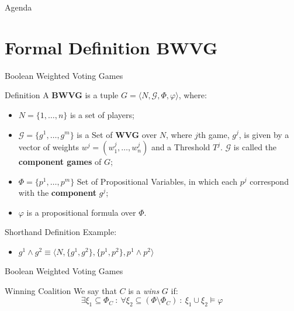 \documentclass{beamer}
\begin{document}
\begin{frame}[fragile]{Agenda}
  \section{Formal Definition BWVG}
  \tableofcontents[currentsection]
\end{frame}

\begin{frame}[fragile]{Boolean Weighted Voting Games}
  \begin{block}{Definition}
    A \textbf{BWVG} is a tuple $G = \langle N, \mathcal{G}, \Phi, \varphi \rangle$, where:
    \begin{itemize}
      \item $N = \{1,\dots,n\}$ is a set of players;
      \item $\mathcal{G} = \{g^1, \dots, g^m\}$ is a Set of \textbf{WVG} over $N$, where $j$th game, $g^j$, is
      given by a vector of weights $w^j = (w_1^j, \dots, w_n^j)$ and a Threshold $T^j$. $\mathcal{G}$ is called the \textbf{component games} of $G$;
      \item $\Phi = \{p^1, \dots, p^m\}$ Set of Propositional Variables, in which each $p^j$ correspond with the \textbf{component} $g^j$;
      \item $\varphi$ is a propositional formula over $\Phi$. 
    \end{itemize}
  \end{block}
  \begin{block}{Shorthand Definition}
    Example:
    \begin{itemize}
      \item $g^1 \land g^2 \equiv \langle N, \{g^1,g^2\}, \{p^1, p^2\}, p^1 \land p^2 \rangle$
    \end{itemize}
  \end{block}
\end{frame}

\begin{frame}[fragile]{Boolean Weighted Voting Games}
  \begin{block}{Winning Coalition}
    We say that $C$ is a \textit{wins} $G$ if:
    \begin{equation}
      \exists \xi_1 \subseteq \Phi_C\ :\ \forall \xi_2 \subseteq (\Phi \setminus \Phi_C)\ :\ \xi_1 \cup \xi_2 \models \varphi \label{eq:1}
    \end{equation}
  \end{block}
\end{frame}
\end{document}
